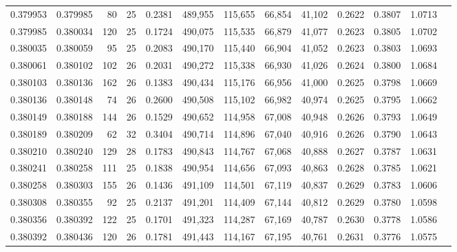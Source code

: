 \begin{tabular}{rrrrrrrrrrrrr}
0.379953 & 0.379985 &    80 &  25 &                                     0.2381 & 489,955 & 115,655 &  66,854 &  41,102 & 0.2622 & 0.3807 & 1.0713 \\
0.379985 & 0.380034 &   120 &  25 &                                     0.1724 & 490,075 & 115,535 &  66,879 &  41,077 & 0.2623 & 0.3805 & 1.0702 \\
0.380035 & 0.380059 &    95 &  25 &                                     0.2083 & 490,170 & 115,440 &  66,904 &  41,052 & 0.2623 & 0.3803 & 1.0693 \\
0.380061 & 0.380102 &   102 &  26 &                                     0.2031 & 490,272 & 115,338 &  66,930 &  41,026 & 0.2624 & 0.3800 & 1.0684 \\
0.380103 & 0.380136 &   162 &  26 &                                     0.1383 & 490,434 & 115,176 &  66,956 &  41,000 & 0.2625 & 0.3798 & 1.0669 \\
0.380136 & 0.380148 &    74 &  26 &                                     0.2600 & 490,508 & 115,102 &  66,982 &  40,974 & 0.2625 & 0.3795 & 1.0662 \\
0.380149 & 0.380188 &   144 &  26 &                                     0.1529 & 490,652 & 114,958 &  67,008 &  40,948 & 0.2626 & 0.3793 & 1.0649 \\
0.380189 & 0.380209 &    62 &  32 &                                     0.3404 & 490,714 & 114,896 &  67,040 &  40,916 & 0.2626 & 0.3790 & 1.0643 \\
0.380210 & 0.380240 &   129 &  28 &                                     0.1783 & 490,843 & 114,767 &  67,068 &  40,888 & 0.2627 & 0.3787 & 1.0631 \\
0.380241 & 0.380258 &   111 &  25 &                                     0.1838 & 490,954 & 114,656 &  67,093 &  40,863 & 0.2628 & 0.3785 & 1.0621 \\
0.380258 & 0.380303 &   155 &  26 &                                     0.1436 & 491,109 & 114,501 &  67,119 &  40,837 & 0.2629 & 0.3783 & 1.0606 \\
0.380308 & 0.380355 &    92 &  25 &                                     0.2137 & 491,201 & 114,409 &  67,144 &  40,812 & 0.2629 & 0.3780 & 1.0598 \\
0.380356 & 0.380392 &   122 &  25 &                                     0.1701 & 491,323 & 114,287 &  67,169 &  40,787 & 0.2630 & 0.3778 & 1.0586 \\
0.380392 & 0.380436 &   120 &  26 &                                     0.1781 & 491,443 & 114,167 &  67,195 &  40,761 & 0.2631 & 0.3776 & 1.0575 \\

\end{tabular}
